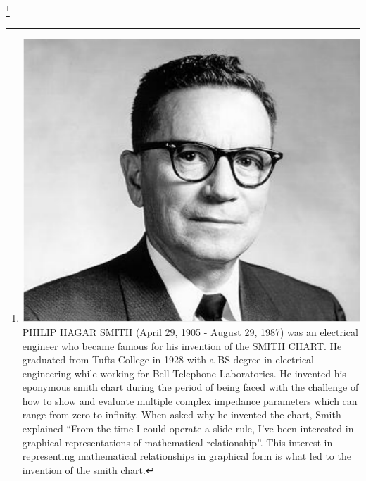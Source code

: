\footnote{\includegraphics[scale=0.09]{./graphics/a21}PHILIP HAGAR SMITH (April 29, 1905 - August 29, 1987) was an electrical engineer who became famous for his invention of the SMITH CHART. He graduated from Tufts College in 1928 with a BS degree in electrical engineering while working for Bell Telephone Laboratories. He invented his eponymous smith chart during the period of being faced with the challenge of how to show and evaluate multiple complex impedance parameters which can range from zero to infinity. When asked why he invented the chart, Smith explained \textquotedblleft From the time I could operate a slide rule, I've been interested in graphical representations of mathematical relationship\textquotedblright. This interest in representing mathematical relationships in graphical form is what led to the invention of the smith chart.}

